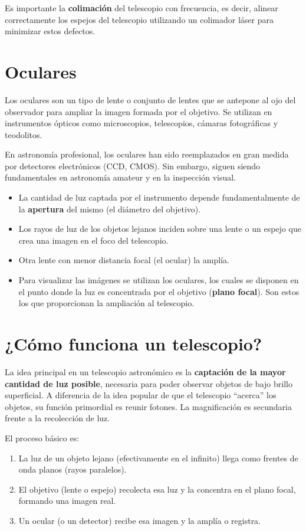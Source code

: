 Es importante la \textbf{colimación} del telescopio con frecuencia, es decir, alinear correctamente los espejos del telescopio utilizando un colimador láser para minimizar estos defectos.



\section{Oculares}

Los oculares son un tipo de lente o conjunto de lentes que se antepone al ojo del observador para ampliar la imagen formada por el objetivo. Se utilizan en instrumentos ópticos como microscopios, telescopios, cámaras fotográficas y teodolitos.

En astronomía profesional, los oculares han sido reemplazados en gran medida por detectores electrónicos (CCD, CMOS). Sin embargo, siguen siendo fundamentales en astronomía amateur y en la inspección visual.

\begin{itemize}
    \item La cantidad de luz captada por el instrumento depende fundamentalmente de la \textbf{apertura} del mismo (el diámetro del objetivo).
    \item Los rayos de luz de los objetos lejanos inciden sobre una lente o un espejo que crea una imagen en el foco del telescopio.
    \item Otra lente con menor distancia focal (el ocular) la amplía.
    \item Para visualizar las imágenes se utilizan los oculares, los cuales se disponen en el punto donde la luz es concentrada por el objetivo (\textbf{plano focal}). Son estos los que proporcionan la ampliación al telescopio.
\end{itemize}

\section{¿Cómo funciona un telescopio?}

La idea principal en un telescopio astronómico es la \textbf{captación de la mayor cantidad de luz posible}, necesaria para poder observar objetos de bajo brillo superficial. A diferencia de la idea popular de que el telescopio ``acerca'' los objetos, su función primordial es reunir fotones. La magnificación es secundaria frente a la recolección de luz.

El proceso básico es:
\begin{enumerate}
    \item La luz de un objeto lejano (efectivamente en el infinito) llega como frentes de onda planos (rayos paralelos).
    \item El objetivo (lente o espejo) recolecta esa luz y la concentra en el plano focal, formando una imagen real.
    \item Un ocular (o un detector) recibe esa imagen y la amplía o registra.
\end{enumerate}

